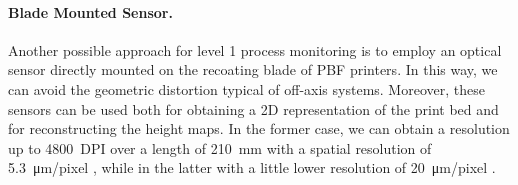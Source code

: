 \paragraph{Blade Mounted Sensor.} Another possible approach for level 1 process monitoring is to employ an optical sensor directly mounted on the recoating blade of PBF printers. In this way, we can avoid the geometric distortion typical of off-axis systems. Moreover, these sensors can be used both for obtaining a 2D representation of the print bed and for reconstructing the height maps. In the former case, we can obtain a resolution up to \SI{4800}{DPI} over a length of \SI{210}{\milli\metre} with a spatial resolution of \SI{5.3}{\micro\metre / pixel} \cite{tan_phuc_high-resolution_2019}, while in the latter with a little lower resolution of \SI{20}{\micro\metre / pixel} \cite{barrett_micron-level_2018}.
